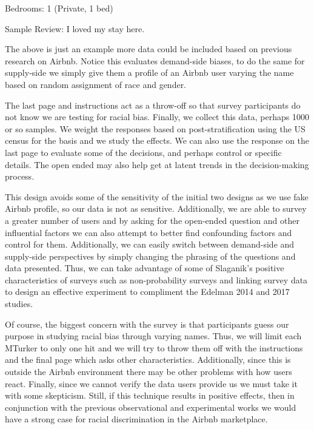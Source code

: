 \documentclass[dvips,12pt]{article}
\begin{document}
Bedrooms: 1 (Private, 1 bed)

Sample Review: I loved my stay here.

\vspace{10pt}

The above is just an example more data could be included based on previous research on Airbnb. Notice this evaluates demand-side biases, to do the same for supply-side we simply give them a profile of an Airbnb user varying the name based on random assignment of race and gender. 

The last page and instructions act as a throw-off so that survey participants do not know we are testing for racial bias. Finally, we collect this data, perhaps 1000 or so samples. We weight the responses based on post-stratification using the US census for the basis and we study the effects. We can also use the response on the last page to evaluate some of the decisions, and perhaps control or specific details.  The open ended may also help get at latent trends in the decision-making process. 

This design avoids some of the sensitivity of the initial two designs as we use fake Airbnb profile, so our data is not as sensitive.  Additionally, we are able to survey a greater number of users and by asking for the open-ended question and other influential factors we can also attempt to better find confounding factors and control for them. Additionally, we can easily switch between demand-side and supply-side perspectives by simply changing the phrasing of the questions and data presented. Thus, we can take advantage of some of Slaganik’s positive characteristics of surveys such as non-probability surveys and linking survey data to design an effective experiment to compliment the Edelman 2014 and 2017 studies.

Of course, the biggest concern with the survey is that participants guess our purpose in studying racial bias through varying names. Thus, we will limit each MTurker to only one hit and we will try to throw them off with the instructions and the final page which asks other characteristics. Additionally, since this is outside the Airbnb environment there may be other problems with how users react. Finally, since we cannot verify the data users provide us we must take it with some skepticism. Still, if this technique results in positive effects, then in conjunction with the previous observational and experimental works we would have a strong case for racial discrimination in the Airbnb marketplace.

\newpage



\nocite{*}
\end{document}
